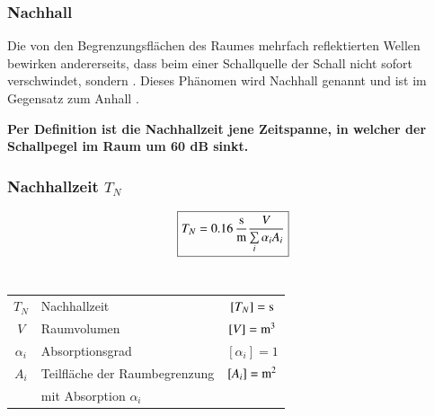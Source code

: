 \subsubsection{Nachhall}

Die von den Begrenzungsflächen des Raumes mehrfach reflektierten Wellen bewirken andererseits, dass beim  einer Schallquelle der Schall nicht sofort verschwindet, sondern . Dieses Phänomen wird Nachhall genannt und ist im Gegensatz zum Anhall . \\
\vspace{0.2cm}

\textbf{Per Definition ist die Nachhallzeit jene Zeitspanne, in welcher der Schallpegel im Raum um 60 dB sinkt.}


\subsubsection{Nachhallzeit $T_N$}


$$ \boxed{ T_N = 0.16 \, \frac{\mathrm{s}}{\mathrm{m}} \frac{V}{\sum\limits_i \alpha_i A_i } } $$ \\

\begin{tabular}{clc}
$T_N$ & Nachhallzeit & $[T_N] = \mathrm{s}$ \\
$V$ & Raumvolumen & $[V] = \mathrm{m}^3$ \\
$\alpha_i$ & Absorptionsgrad & $[\alpha_i] = 1$ \\
$A_i$ & Teilfläche der Raumbegrenzung & $[A_i] = \mathrm{m}^2$ \\ 
& mit Absorption $\alpha_i$ \\
\end{tabular}

